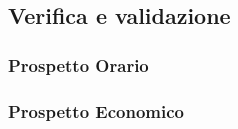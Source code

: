 \subsection{Verifica e validazione}

\subsubsection{Prospetto Orario}

\subsubsection{Prospetto Economico}
 
\pagebreak